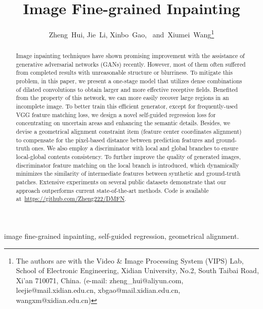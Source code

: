 \documentclass[journal]{IEEEtran}
\begin{document}
\title{Image Fine-grained Inpainting}


\author{Zheng~Hui,
        Jie~Li,
        Xinbo~Gao,~
        and~Xiumei~Wang\thanks{The authors are with the Video \& Image Processing System (VIPS) Lab, School of Electronic Engineering, Xidian University, No.2, South Taibai Road, Xi'an 710071, China. (e-mail: zheng\_hui@aliyun.com, leejie@mail.xidian.edu.cn, xbgao@mail.xidian.edu.cn, wangxm@xidian.edu.cn)}}




\maketitle

\begin{abstract}
Image inpainting techniques have shown promising improvement with the assistance of generative adversarial networks (GANs) recently. However, most of them often suffered from completed results with unreasonable structure or blurriness. To mitigate this problem, in this paper, we present a one-stage model that utilizes dense combinations of dilated convolutions to obtain larger and more effective receptive fields. Benefited from the property of this network, we can more easily recover large regions in an incomplete image. To better train this efficient generator, except for frequently-used VGG feature matching loss, we design a novel self-guided regression loss for concentrating on uncertain areas and enhancing the semantic details. Besides, we devise a geometrical alignment constraint item (feature center coordinates alignment) to compensate for the pixel-based distance between prediction features and ground-truth ones. We also employ a discriminator with local and global branches to ensure local-global contents consistency. To further improve the quality of generated images, discriminator feature matching on the local branch is introduced, which dynamically minimizes the similarity of intermediate features between synthetic and ground-truth patches. Extensive experiments on several public datasets demonstrate that our approach outperforms current state-of-the-art methods. Code is available at~\url{https://github.com/Zheng222/DMFN}.
\end{abstract}

\begin{IEEEkeywords}
image fine-grained inpainting, self-guided regression, geometrical alignment.
\end{IEEEkeywords}
\end{document}
